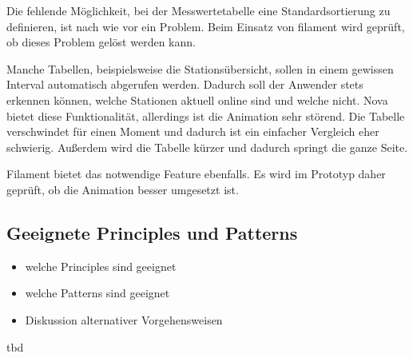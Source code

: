 \newpage

Die fehlende Möglichkeit, bei der Messwertetabelle eine Standardsortierung zu definieren, ist nach wie vor ein Problem.
Beim Einsatz von filament wird geprüft, ob dieses Problem gelöst werden kann.

Manche Tabellen, beispielsweise die Stationsübersicht, sollen in einem gewissen Interval automatisch abgerufen werden.
Dadurch soll der Anwender stets erkennen können, welche Stationen aktuell online sind und welche nicht.
Nova bietet diese Funktionalität, allerdings ist die Animation sehr störend.
Die Tabelle verschwindet für einen Moment und dadurch ist ein einfacher Vergleich eher schwierig.
Außerdem wird die Tabelle kürzer und dadurch springt die ganze Seite.

Filament bietet das notwendige Feature ebenfalls.
Es wird im Prototyp daher geprüft, ob die Animation besser umgesetzt ist.

\subsection{Geeignete Principles und Patterns}
\color{red}
\begin{itemize}
    \item welche Principles sind geeignet
    \item welche Patterns sind geeignet
    \item Diskussion alternativer Vorgehensweisen
\end{itemize}

tbd
\color{black}
